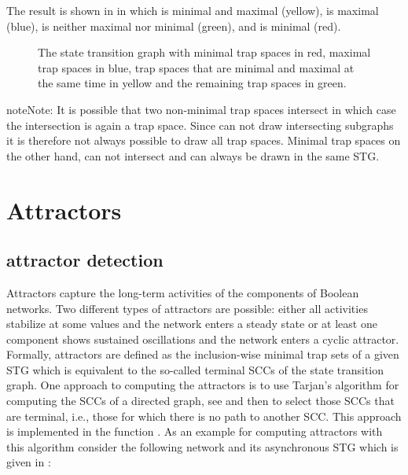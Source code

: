 \documentclass[letterpaper,10pt,english]{sphinxmanual}
\begin{document}
The result is shown in {\hyperref[\detokenize{Manual:figure24}]{}} in which  is minimal and maximal (yellow),
 is maximal (blue),  is neither maximal nor minimal (green), and  is minimal (red).

\begin{figure}[htbp]
\centering
\capstart

\noindent{}
\caption{The state transition graph  with minimal trap spaces in red, maximal trap spaces in blue,
trap spaces that are minimal and maximal at the same time in yellow and the remaining trap spaces in green.}\label{\detokenize{Manual:figure24}}\label{\detokenize{Manual:id28}}\end{figure}

\begin{sphinxadmonition}{note}{Note:}
It is possible that two non-minimal trap spaces intersect in which case the intersection is again a trap space.
Since {\hyperref[\detokenize{Installation:installation-graphviz}]{}} can not draw intersecting subgraphs it is therefore not always possible to draw all trap spaces.
Minimal trap spaces on the other hand, can not intersect and can always be drawn in the same STG.
\end{sphinxadmonition}


\section{Attractors}
\label{\detokenize{Manual:attractors}}

\subsection{attractor detection}
\label{\detokenize{Manual:attractor-detection}}
Attractors capture the long-term activities of the components of Boolean networks.
Two different types of attractors are possible: either all activities stabilize at some values and the network enters a steady state or at least one component shows sustained oscillations and the network enters a cyclic attractor.
Formally, attractors are defined as the inclusion-wise minimal trap sets of a given STG which is equivalent to the so-called terminal SCCs of the state transition graph.
One approach to computing the attractors is to use Tarjan’s algorithm for computing the SCCs of a directed graph, see {\hyperref[\detokenize{Bibliography:tarjan1972}]{}} and then to select those SCCs that are terminal, i.e., those for which there is no path to another SCC.
This approach is implemented in the function {\hyperref[\detokenize{AttractorDetection:compute-attractors-tarjan}]{}}.
As an example for computing attractors with this algorithm consider the following network and its asynchronous STG which is given in {\hyperref[\detokenize{Manual:figure25}]{}}:
\end{document}
